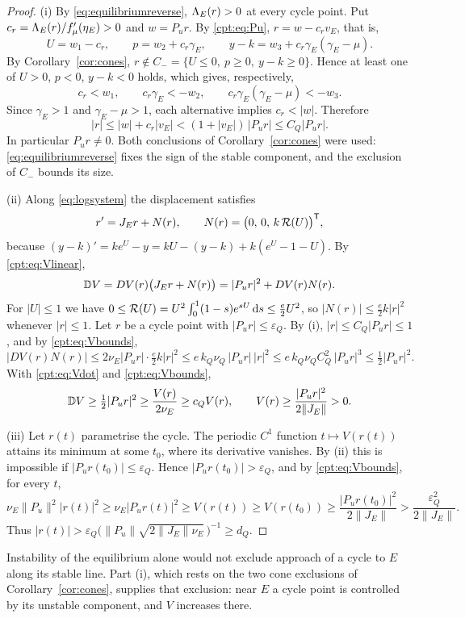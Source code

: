 \begin{proof}
(i) By \eqref{eq:equilibriumreverse}, $\Lambda_E(r)>0$ at every cycle point. Put $c_r=\Lambda_E(r)/f_\mu'(\eta_E)>0$ and $w=P_ur$. By \eqref{cpt:eq:Pu}, $r=w-c_rv_E$, that is,
\[
U=w_1-c_r,\qquad p=w_2+c_r\gamma_E,\qquad y-k=w_3+c_r\gamma_E(\gamma_E-\mu).
\]
By Corollary~\ref{cor:cones}, $r\notin C_-=\{U\le0,\ p\ge0,\ y-k\ge0\}$. Hence at least one of $U>0$, $p<0$, $y-k<0$ holds, which gives, respectively,
\[
c_r<w_1,\qquad c_r\gamma_E<-w_2,\qquad c_r\gamma_E(\gamma_E-\mu)<-w_3 .
\]
Since $\gamma_E>1$ and $\gamma_E-\mu>1$, each alternative implies $c_r<|w|$. Therefore
\[
|r|\le|w|+c_r|v_E|<(1+|v_E|)\,|P_ur|\le C_Q|P_ur| .
\]
In particular $P_ur\ne0$. Both conclusions of Corollary~\ref{cor:cones} were used: \eqref{eq:equilibriumreverse} fixes the sign of the stable component, and the exclusion of $C_-$ bounds its size.

(ii) Along \eqref{eq:logsystem} the displacement satisfies
\[
r'=J_Er+N(r),\qquad N(r)=\bigl(0,\,0,\,k\,\mathcal R(U)\bigr)^{\mathsf T},
\]
because $(y-k)'=ke^U-y=kU-(y-k)+k(e^U-1-U)$. By \eqref{cpt:eq:Vlinear},
\begin{equation}\label{cpt:eq:Vdot}
\mathbb D V=DV(r)\bigl(J_Er+N(r)\bigr)=|P_ur|^2+DV(r)N(r).
\end{equation}
For $|U|\le1$ we have $0\le\mathcal R(U)=U^2\int_0^1(1-s)e^{sU}\,\mathrm ds\le\tfrac e2U^2$, so $|N(r)|\le\tfrac e2k|r|^2$ whenever $|r|\le1$. Let $r$ be a cycle point with $|P_ur|\le\varepsilon_Q$. By (i), $|r|\le C_Q|P_ur|\le1$, and by \eqref{cpt:eq:Vbounds},
\[
|DV(r)N(r)|\le2\nu_E|P_ur|\cdot\tfrac e2k|r|^2
\le e\,k_Q\nu_Q\,|P_ur|\,|r|^2
\le e\,k_Q\nu_QC_Q^2\,|P_ur|^3\le\tfrac12|P_ur|^2 .
\]
With \eqref{cpt:eq:Vdot} and \eqref{cpt:eq:Vbounds},
\[
\mathbb D V\ge\tfrac12|P_ur|^2\ge\frac{V(r)}{2\nu_E}\ge c_QV(r),\qquad
V(r)\ge\frac{|P_ur|^2}{2\|J_E\|}>0 .
\]

(iii) Let $r(t)$ parametrise the cycle. The periodic $C^1$ function $t\mapsto V(r(t))$ attains its minimum at some $t_0$, where its derivative vanishes. By (ii) this is impossible if $|P_ur(t_0)|\le\varepsilon_Q$. Hence $|P_ur(t_0)|>\varepsilon_Q$, and by \eqref{cpt:eq:Vbounds}, for every $t$,
\[
\nu_E\|P_u\|^2|r(t)|^2\ge\nu_E|P_ur(t)|^2\ge V(r(t))\ge V(r(t_0))\ge\frac{|P_ur(t_0)|^2}{2\|J_E\|}>\frac{\varepsilon_Q^2}{2\|J_E\|} .
\]
Thus $|r(t)|>\varepsilon_Q\bigl(\|P_u\|\sqrt{2\|J_E\|\nu_E}\,\bigr)^{-1}\ge d_Q$.
\end{proof}
Instability of the equilibrium alone would not exclude approach of a cycle to $E$ along its stable line. Part (i), which rests on the two cone exclusions of Corollary~\ref{cor:cones}, supplies that exclusion: near $E$ a cycle point is controlled by its unstable component, and $V$ increases there.

